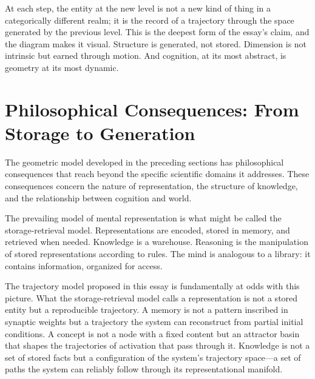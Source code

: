 \documentclass[11pt, a4paper]{article}
\theoremstyle{plain}
\theoremstyle{definition}
\theoremstyle{remark}
\begin{document}
At each step, the entity at the new level is not a new kind of thing in a categorically
different realm; it is the record of a trajectory through the space generated by the
previous level. This is the deepest form of the essay's claim, and the diagram makes
it visual. Structure is generated, not stored. Dimension is not intrinsic but earned
through motion. And cognition, at its most abstract, is geometry at its most dynamic.


\section{Philosophical Consequences: From Storage to Generation}

The geometric model developed in the preceding sections has philosophical consequences
that reach beyond the specific scientific domains it addresses. These consequences
concern the nature of representation, the structure of knowledge, and the relationship
between cognition and world.

The prevailing model of mental representation is what might be called the
storage-retrieval model. Representations are encoded, stored in memory, and retrieved
when needed. Knowledge is a warehouse. Reasoning is the manipulation of stored
representations according to rules. The mind is analogous to a library: it contains
information, organized for access.

The trajectory model proposed in this essay is fundamentally at odds with this picture.
What the storage-retrieval model calls a representation is not a stored entity but a
reproducible trajectory. A memory is not a pattern inscribed in synaptic weights but a
trajectory the system can reconstruct from partial initial conditions. A concept is not
a node with a fixed content but an attractor basin that shapes the trajectories of
activation that pass through it. Knowledge is not a set of stored facts but a
configuration of the system's trajectory space---a set of paths the system can reliably
follow through its representational manifold.
\end{document}
